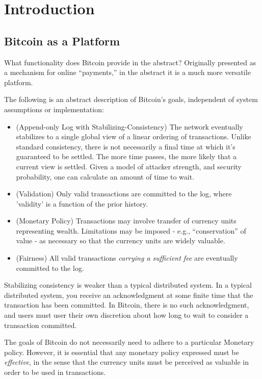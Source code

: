\section{Introduction}\label{intro}


\subsection{Bitcoin as a Platform}

What functionality does Bitcoin provide in the abstract? Originally presented as a mechanism for online ``payments,'' in the abstract it is a much more versatile platform.

The following is an abstract description of Bitcoin's goals, independent of system assumptions or implementation:
\begin{itemize}
\item (Append-only Log with Stabilizing-Consistency) The network eventually stabilizes to a single global view of a linear ordering of transactions. Unlike standard consistency, there is not necessarily a final time at which it's guaranteed to be settled. The more time passes, the more likely that a current view is settled. Given a model of attacker strength, and security probability, one can calculate an amount of time to wait.
\item (Validation) Only valid transactions are committed to the log, where 'validity' is a function of the prior history.
\item (Monetary Policy) Transactions may involve transfer of currency units representing wealth. Limitations may be imposed - e.g., ``conservation'' of value - as necessary so that the currency units are widely valuable.
\item (Fairness) All valid transactions {\em carrying a sufficient fee} are eventually committed to the log.
\end{itemize}

Stabilizing consistency is weaker than a typical distributed system. In a typical distributed system, you receive an acknowledgment at some finite time that the transaction has been committed. In Bitcoin, there is no such acknowledgment, and users must user their own discretion about how long to wait to consider a transaction committed.

The goals of Bitcoin do not necessarily need to adhere to a particular Monetary policy. However, it is essential that any monetary policy expressed must be {\em effective}, in the sense that the currency units must be perceived as valuable in order to be used in transactions.

